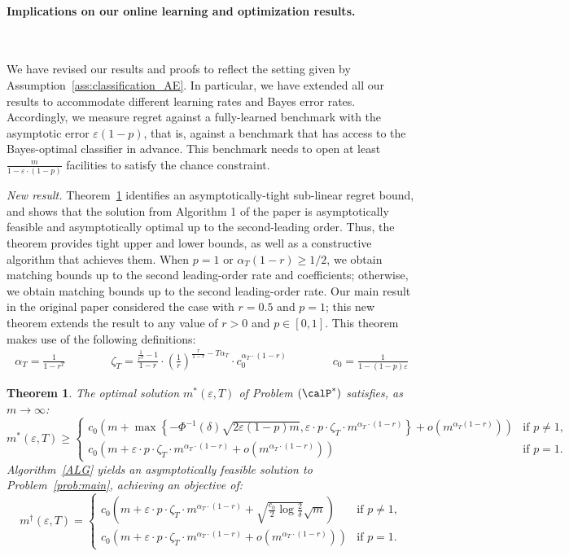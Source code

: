 \documentclass[11pt]{article}
\newtheorem{theorem}{Theorem}[] %
\begin{document}
\paragraph{Implications on our online learning and optimization results.}\

We have revised our results and proofs to reflect the setting given by Assumption~\ref{ass:classification_AE}. In particular, we have extended all our results to accommodate different learning rates and Bayes error rates. Accordingly, we measure regret against a fully-learned benchmark with the asymptotic error $\varepsilon (1-p)$, that is, against a benchmark that has access to the Bayes-optimal classifier in advance. This benchmark needs to open at least $\frac{m}{1-\varepsilon\cdot(1-p)}$ facilities to satisfy the chance constraint.

\textit{New result.}
Theorem~\ref{thm:main_AE} identifies an asymptotically-tight sub-linear regret bound, and shows that the solution from Algorithm 1 of the paper is asymptotically feasible and asymptotically optimal up to the second-leading order. Thus, the theorem provides tight upper and lower bounds, as well as a constructive algorithm that achieves them. When $p=1$ or $\alpha_T(1-r)\geq1/2$, we obtain matching bounds up to the second leading-order rate and coefficients; otherwise, we obtain matching bounds up to the second leading-order rate. Our main result in the original paper considered the case with $r=0.5$ and $p=1$; this new theorem extends the result to any value of $r>0$ and $p\in[0,1]$. This theorem makes use of the following definitions:
\begin{align*}
	\alpha_T=\frac{1}{1-r^T}\qquad\qquad
	\zeta_T=\frac{\frac{1}{r^T}-1}{1-r}\cdot\left(\frac{1}{r}\right)^{\frac{r}{1-r}-T\alpha_T}\cdot c_0^{\alpha_T\cdot(1-r)} \qquad\qquad c_0 = \frac{1}{1-(1-p)\varepsilon}
\end{align*}
\setcounter{theorem}{0}
\begin{theorem}\label{thm:main_AE}
	The optimal solution $m^*(\varepsilon, T)$ of Problem $(\calP^*)$ satisfies, as $m \to \infty$:
    $$m^*(\varepsilon, T)\geq \begin{cases}
      c_0\left(m +\max\left\{-\Phi^{-1}(\delta)\sqrt{2\varepsilon(1-p)m}, \varepsilon \cdot p \cdot \zeta_T\cdot m^{\alpha_T\cdot(1-r)}\right\}+o\left(m^{\alpha_T(1-r)}\right)\right) & \text{if }p \neq 1,\\
          c_0\left(m +\varepsilon\cdot p\cdot\zeta_T\cdot m^{\alpha_T\cdot(1-r)} +  o\left(m^{\alpha_T\cdot(1-r)}\right)\right) & \text{if }p=1.
      \end{cases}$$
	Algorithm~\ref{ALG} yields an asymptotically feasible solution to Problem~\eqref{prob:main}, achieving an objective of:
    $$m^\dagger(\varepsilon,T)=\begin{cases}
        c_0\left( m+\varepsilon\cdot p\cdot \zeta_T \cdot m^{\alpha_T\cdot(1-r)} +  \sqrt{\frac{c_0}{2}\log \frac{2}{\delta}}\sqrt{m}\right) &  \text{if }p\neq 1,\\
   c_0\left( m+\varepsilon\cdot p\cdot \zeta_T \cdot m^{\alpha_T\cdot(1-r)} +  o\left(m^{\alpha_T\cdot(1-r)}\right)\right) &  \text{if }p=1.
    \end{cases}$$
\end{theorem}
\end{document}
